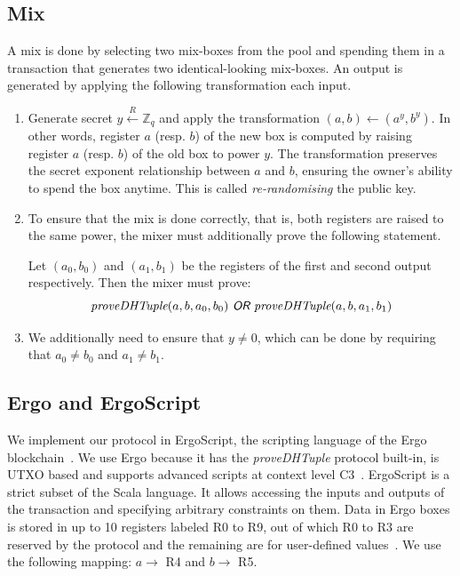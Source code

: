 \documentclass[runningheads]{llncs}
\newcommand{\rand}{\stackrel{R}{\leftarrow}}
\begin{document}
\subsection{Mix}
\label{mix}

A mix is done by selecting two mix-boxes from the pool and spending them in a transaction that generates two identical-looking mix-boxes. An output is generated by applying the following transformation each input.

\begin{enumerate}
\item Generate secret $y \rand \mathbb{Z}_q$ and apply the transformation $(a, b) \leftarrow (a ^y, b ^y)$. In other words, register $a$ (resp. $b$) of the new box is computed by raising register $a$ (resp. $b$) of the old box to power $y$. The transformation preserves the secret exponent relationship between $a$ and $b$, ensuring the owner's ability to spend the box anytime. This is called {\em re-randomising} the public key.
\item To ensure that the mix is done correctly, that is, both registers are raised to the same power, the mixer must additionally prove the following statement.

Let $(a_0, b_0)$ and $(a_1, b_1)$ be the registers of the first and second output respectively. Then the mixer must prove:
$$\text{\em proveDHTuple$(a, b, a_0, b_0)\textsf{ OR }$proveDHTuple$(a, b, a_1, b_1)$}$$

\item We additionally need to ensure that $y \neq 0$, which can be done by requiring that $a_0 \neq b_0$ and $a_1 \neq b_1$.

\end{enumerate}

\subsection{Ergo and ErgoScript}

We implement our protocol in ErgoScript, the scripting language of the Ergo blockchain~\cite{ergo,tutorial}.
We use Ergo because it has the {\em proveDHTuple} protocol built-in, is UTXO based and supports advanced scripts at
context level C3~\cite{bypassing}. ErgoScript is a strict subset of the Scala language.
It allows accessing the inputs and outputs of the transaction and specifying arbitrary constraints on them.
Data in Ergo boxes is stored in up to 10 registers labeled R0 to R9, out of which R0 to R3 are reserved by the protocol and the remaining are for user-defined values~\cite{tutorial}. We use the following mapping: $a \rightarrow$ R4 and $b \rightarrow$ R5.
\end{document}
